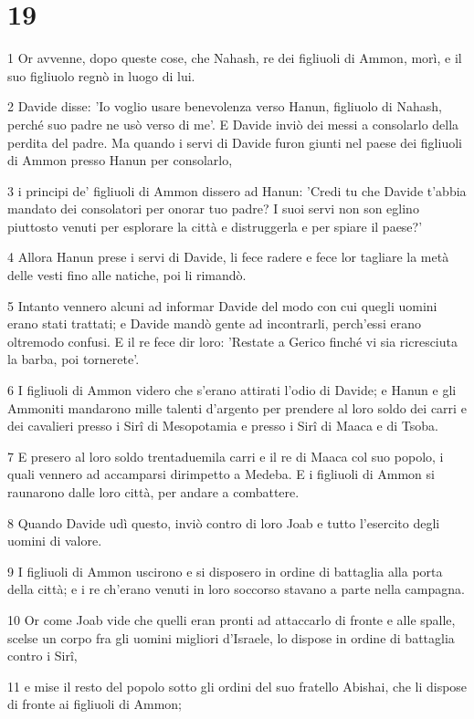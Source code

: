 \chapter{19}

\par 1 Or avvenne, dopo queste cose, che Nahash, re dei figliuoli di Ammon, morì, e il suo figliuolo regnò in luogo di lui.
\par 2 Davide disse: 'Io voglio usare benevolenza verso Hanun, figliuolo di Nahash, perché suo padre ne usò verso di me'. E Davide inviò dei messi a consolarlo della perdita del padre. Ma quando i servi di Davide furon giunti nel paese dei figliuoli di Ammon presso Hanun per consolarlo,
\par 3 i principi de' figliuoli di Ammon dissero ad Hanun: 'Credi tu che Davide t'abbia mandato dei consolatori per onorar tuo padre? I suoi servi non son eglino piuttosto venuti per esplorare la città e distruggerla e per spiare il paese?'
\par 4 Allora Hanun prese i servi di Davide, li fece radere e fece lor tagliare la metà delle vesti fino alle natiche, poi li rimandò.
\par 5 Intanto vennero alcuni ad informar Davide del modo con cui quegli uomini erano stati trattati; e Davide mandò gente ad incontrarli, perch'essi erano oltremodo confusi. E il re fece dir loro: 'Restate a Gerico finché vi sia ricresciuta la barba, poi tornerete'.
\par 6 I figliuoli di Ammon videro che s'erano attirati l'odio di Davide; e Hanun e gli Ammoniti mandarono mille talenti d'argento per prendere al loro soldo dei carri e dei cavalieri presso i Sirî di Mesopotamia e presso i Sirî di Maaca e di Tsoba.
\par 7 E presero al loro soldo trentaduemila carri e il re di Maaca col suo popolo, i quali vennero ad accamparsi dirimpetto a Medeba. E i figliuoli di Ammon si raunarono dalle loro città, per andare a combattere.
\par 8 Quando Davide udì questo, inviò contro di loro Joab e tutto l'esercito degli uomini di valore.
\par 9 I figliuoli di Ammon uscirono e si disposero in ordine di battaglia alla porta della città; e i re ch'erano venuti in loro soccorso stavano a parte nella campagna.
\par 10 Or come Joab vide che quelli eran pronti ad attaccarlo di fronte e alle spalle, scelse un corpo fra gli uomini migliori d'Israele, lo dispose in ordine di battaglia contro i Sirî,
\par 11 e mise il resto del popolo sotto gli ordini del suo fratello Abishai, che li dispose di fronte ai figliuoli di Ammon;

